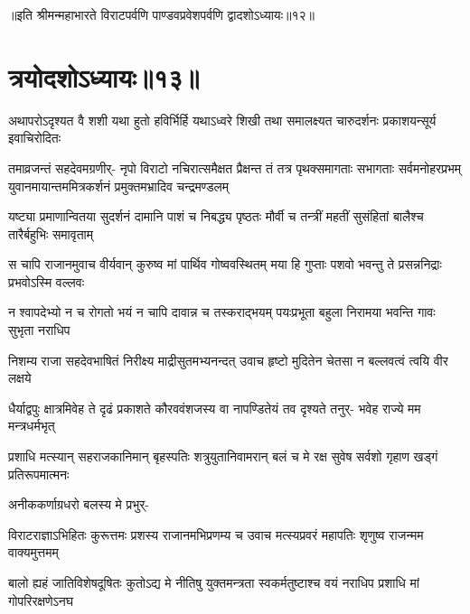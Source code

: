 ॥इति श्रीमन्महाभारते विराटपर्वणि पाण्डवप्रवेशपर्वणि द्वादशोऽध्यायः॥१२॥

\chapter{त्रयोदशोऽध्यायः॥१३॥}

\fourlineindentedshloka
{अथापरोऽदृश्यत वै शशी यथा}
{हुतो हविर्भिर्हि यथाऽध्वरे शिखी}
{तथा समालक्ष्यत चारुदर्शनः}
{प्रकाशयन्सूर्य इवाचिरोदितः}


\sixlineindentedshloka
{तमाव्रजन्तं सहदेवमग्रणीर्-}
{नृपो विराटो नचिरात्समैक्षत}
{प्रैक्षन्त तं तत्र पृथक्समागताः}
{सभागताः सर्वमनोहरप्रभम्}
{युवानमायान्तममित्रकर्शनं}
{प्रमुक्तमभ्रादिव चन्द्रमण्डलम्}


\fourlineindentedshloka
{यष्ट्या प्रमाणान्वितया सुदर्शनं}
{दामानि पाशं च निबद्ध्य पृष्ठतः}
{मौर्वी च तन्त्रीं महतीं सुसंहितां}
{बालैश्च तारैर्बहुभिः समावृताम्}


\fourlineindentedshloka
{स चापि राजानमुवाच वीर्यवान्}
{कुरुष्व मां पार्थिव गोष्ववस्थितम्}
{मया हि गुप्ताः पशवो भवन्तु ते}
{प्रसन्ननिद्राः प्रभवोऽस्मि वल्लवः}


\fourlineindentedshloka
{न श्वापदेभ्यो न च रोगतो भयं}
{न चापि दावान्न च तस्कराद्भयम्}
{पयःप्रभूता बहुला निरामया}
{भवन्ति गावः सुभृता नराधिप}


\fourlineindentedshloka
{निशम्य राजा सहदेवभाषितं}
{निरीक्ष्य माद्रीसुतमभ्यनन्दत्}
{उवाच हृष्टो मुदितेन चेतसा}
{न बल्लवत्वं त्वयि वीर लक्षये}


\fourlineindentedshloka
{धैर्याद्वपुः क्षात्रमिवेह ते दृढं}
{प्रकाशते कौरववंशजस्य वा}
{नापण्डितेयं तव दृश्यते तनुर्-}
{भवेह राज्ये मम मन्त्रधर्मभृत्}


\fourlineindentedshloka
{प्रशाधि मत्स्यान् सहराजकानिमान्}
{बृहस्पतिः शत्रुयुतानिवामरान्}
{बलं च मे रक्ष सुवेष सर्वशो}
{गृहाण खड्गं प्रतिरूपमात्मनः}


{अनीककर्णाग्रधरो बलस्य मे प्रभुर्-\hspace{\shlokaspaceskip}}\\



\fourlineindentedshloka
{विराटराज्ञाऽभिहितः कुरूत्तमः}
{प्रशस्य राजानमभिप्रणम्य च}
{उवाच मत्स्यप्रवरं महापतिः}
{शृणुष्व राजन्मम वाक्यमुत्तमम्}


\fourlineindentedshloka
{बालो ह्यहं जातिविशेषदूषितः}
{कुतोऽद्य मे नीतिषु युक्तमन्त्रता}
{स्वकर्मतुष्टाश्च वयं नराधिप}
{प्रशाधि मां गोपरिरक्षणेऽनघ}


